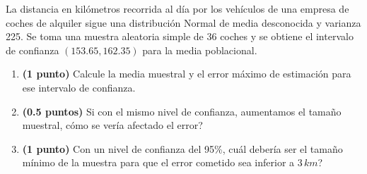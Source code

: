 
La distancia en kilómetros recorrida al día por los vehículos de una
empresa de coches de alquiler sigue una distribución Normal de media
desconocida y varianza 225. Se toma una muestra aleatoria simple de 36 coches
y se obtiene el intervalo de confianza $(153.65,162.35)$ para la media poblacional.
\begin{enumerate}[label=\alph*)]
  \item \textbf{(1 punto)} Calcule la media muestral y el error máximo de
  estimación para ese intervalo de confianza.
  \item \textbf{(0.5 puntos)} Si con el mismo nivel de confianza, aumentamos
  el tamaño muestral, \textquestiondown{}cómo se vería afectado el error?
  \item \textbf{(1 punto)} Con un nivel de confianza del 95\%,
  \textquestiondown{}cuál debería ser el tamaño mínimo de la muestra para
  que el error cometido sea inferior a $3\,km$?
\end{enumerate}
